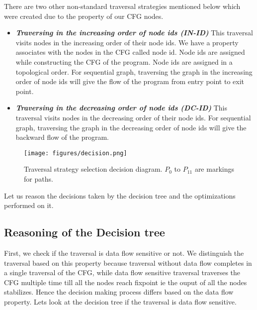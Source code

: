 There are two other non-standard traversal strategies mentioned below which were
created due to the property of our CFG nodes.
\begin{itemize}
\item \textbf{\textit{Traversing in the increasing order of node ids (IN-ID)}}
This traversal visits nodes in the increasing order of their node ids. We have a
property associates with the nodes in the CFG called node id. Node ids are
assigned while constructing the CFG of the program. Node ids are assigned in a
topological order. For sequential graph, traversing the graph in the increasing
order of node ids will give the flow of the program from entry point to exit
point.

\item \textbf{\textit{Traversing in the decreasing order of node ids (DC-ID)}}
This traversal visits nodes in the decreasing order of their node ids. For
sequential graph, traversing the graph in the decreasing order of node ids will
give the backward flow of the program.
\end{itemize}

\begin{figure}[ht!]
\centering
\texttt{[image: figures/decision.png]}
\caption{Traversal strategy selection decision diagram. $P_0$ to $P_{11}$ are
markings for paths.}
\label{fig:decision-diagram}
\end{figure}

Let us reason the decisions taken by the decision tree and the optimizations
performed on it.
\subsection{Reasoning of the Decision tree}
\label{sec:Decision tree explained}
First, we check if the traversal is data flow sensitive or not. We distinguish
the traversal based on this property because traversal without data flow
completes in a single traversal of the CFG, while data flow sensitive traversal
traverses the CFG multiple time till all the nodes reach fixpoint ie the ouput
of all the nodes stabilizes. Hence the decision making process differs based on
the data flow  property. Lets look at the decision tree if the traversal is data
flow sensitive.\newline
